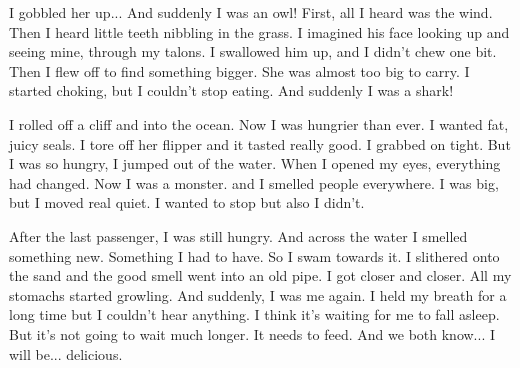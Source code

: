 \documentclass[10pt,a4paper]{article}
\newcommand{\noun}[1]{\textcolor{nouncolor}{#1}}
\newcommand{\wverb}[1]{\textcolor{verbcolor}{#1}}
\newcommand{\adj}[1]{\textcolor{adjcolor}{#1}}
\newcommand{\pron}[1]{\textcolor{proncolor}{#1}}
\newcommand{\adv}[1]{\textcolor{advcolor}{#1}}
\newcommand{\prep}[1]{\textcolor{prepcolor}{#1}}
\newcommand{\conj}[1]{\textcolor{conjcolor}{#1}}
\newcommand{\detw}[1]{\textcolor{detcolor}{#1}}
\begin{document}
\pron{I} \wverb{gobbled} \pron{her} \adv{up}... \conj{And} \adv{suddenly} \pron{I} \wverb{was} \detw{an} \noun{owl}! \adv{First}, \adv{all} \pron{I} \wverb{heard} \wverb{was} \detw{the} \noun{wind}. \adv{Then} \pron{I} \wverb{heard} \adj{little} \noun{teeth} \noun{nibbling} \prep{in} \detw{the} \noun{grass}. \pron{I} \wverb{imagined} \pron{his} \noun{face} \wverb{looking} \adv{up} \conj{and} \wverb{seeing} \pron{mine}, \prep{through} \pron{my} \noun{talons}. \pron{I} \wverb{swallowed} \pron{him} \adv{up}, \conj{and} \pron{I} \wverb{didn't} \wverb{chew} \detw{one} \noun{bit}. \adv{Then} \pron{I} \wverb{flew} \adv{off} \prep{to} \wverb{find} \noun{something} \adj{bigger}. \pron{She} \wverb{was} \adv{almost} \adv{too} \adj{big} \prep{to} \wverb{carry}. \pron{I} \wverb{started} \noun{choking}, \conj{but} \pron{I} \wverb{couldn't} \wverb{stop} \wverb{eating}. \conj{And} \adv{suddenly} \pron{I} \wverb{was} \detw{a} \noun{shark}!

\pron{I} \wverb{rolled} \adv{off} \detw{a} \noun{cliff} \conj{and} \prep{into} \detw{the} \noun{ocean}. \adv{Now} \pron{I} \wverb{was} \adj{hungrier} \prep{than} \adv{ever}. \pron{I} \wverb{wanted} \adj{fat}, \adj{juicy} \noun{seals}. \pron{I} \wverb{tore} \adv{off} \pron{her} \noun{flipper} \conj{and} \pron{it} \wverb{tasted} \adv{really} \adj{good}. \pron{I} \wverb{grabbed} \adv{on} \adj{tight}. \conj{But} \pron{I} \wverb{was} \adv{so} \adj{hungry}, \pron{I} \wverb{jumped} \adv{out} \prep{of} \detw{the} \noun{water}. \adv{When} \pron{I} \wverb{opened} \pron{my} \noun{eyes}, \noun{everything} \wverb{had} \wverb{changed}. \adv{Now} \pron{I} \wverb{was} \detw{a} \noun{monster}. \conj{and} \pron{I} \wverb{smelled} \noun{people} \adv{everywhere}. \pron{I} \wverb{was} \adj{big}, \conj{but} \pron{I} \wverb{moved} \adv{real} \adj{quiet}. \pron{I} \wverb{wanted} \prep{to} \wverb{stop} \conj{but} \adv{also} \pron{I} \wverb{didn't}.

\prep{After} \detw{the} \adj{last} \noun{passenger}, \pron{I} \wverb{was} \adv{still} \adj{hungry}. \conj{And} \adv{across} \detw{the} \noun{water} \pron{I} \wverb{smelled} \noun{something} \adj{new}. \noun{Something} \pron{I} \wverb{had} \prep{to} \wverb{have}. \adv{So} \pron{I} \wverb{swam} \prep{towards} \pron{it}. \pron{I} \wverb{slithered} \prep{onto} \detw{the} \noun{sand} \conj{and} \detw{the} \adj{good} \noun{smell} \wverb{went} \prep{into} \detw{an} \adj{old} \noun{pipe}. \pron{I} \wverb{got} \adj{closer} \conj{and} \adj{closer}. \adv{All} \pron{my} \noun{stomachs} \wverb{started} \noun{growling}. \conj{And} \adv{suddenly}, \pron{I} \wverb{was} \pron{me} \adv{again}. \pron{I} \wverb{held} \pron{my} \noun{breath} \prep{for} \detw{a} \adj{long} \noun{time} \conj{but} \pron{I} \wverb{couldn't} \wverb{hear} \noun{anything}. \pron{I} \wverb{think} \pron{it}'\wverb{s} \wverb{waiting} \prep{for} \pron{me} \prep{to} \wverb{fall} \adj{asleep}. \conj{But} \pron{it}'\wverb{s} \adv{not} \wverb{going} \prep{to} \wverb{wait} \adv{much} \adj{longer}. \pron{It} \wverb{needs} \prep{to} \wverb{feed}. \conj{And} \pron{we} \adv{both} \wverb{know}... \pron{I} \wverb{will} \wverb{be}... \adj{delicious}.
\end{document}
